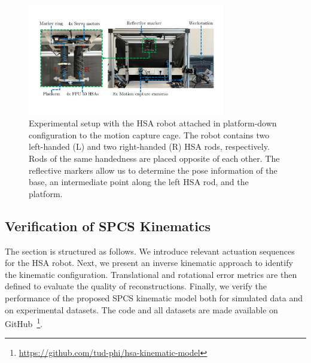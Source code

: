 
\begin{figure}
    \centering
    \includegraphics[width=0.77\textwidth]{hsamodel/figures/experimental_setup/experimental_setup_v3_compressed.pdf}
    \caption{Experimental setup with the \gls{HSA} robot attached in platform-down configuration to the motion capture cage. The robot contains two left-handed (L) and two right-handed (R) \gls{HSA} rods, respectively. Rods of the same handedness are placed opposite of each other. The reflective markers allow us to determine the pose information of the base, an intermediate point along the left \gls{HSA} rod, and the platform.}\label{fig:hsamodel:experimental_setup}
\end{figure}



\subsection{Verification of SPCS Kinematics}\label{sub:hsamodel:hsa_rod_kinematics:verification}
The section is structured as follows. We introduce relevant actuation sequences for the \gls{HSA} robot.
Next, we present an inverse kinematic approach to identify the kinematic configuration.
Translational and rotational error metrics are then defined to evaluate the quality of reconstructions. %
Finally, we verify the performance of the proposed \gls{SPCS} kinematic model both for simulated data and on experimental datasets.
The code and all datasets are made available on GitHub~\footnote{\scriptsize \url{https://github.com/tud-phi/hsa-kinematic-model}}.

